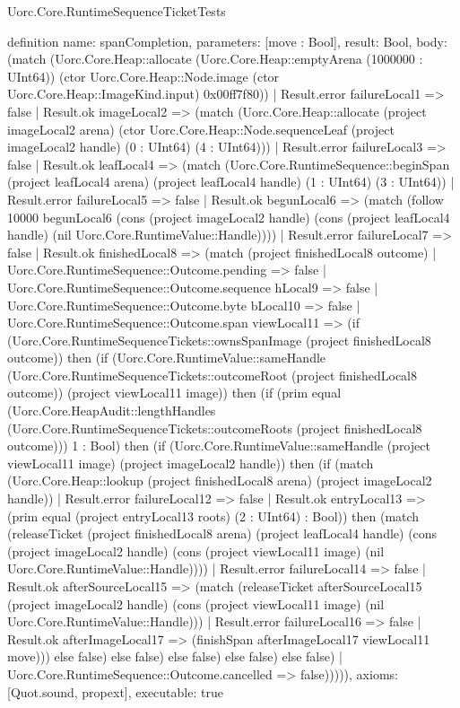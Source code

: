 \begin{lexlean}{Uorc.Core.RuntimeSequenceTicketTests}
\begin{semanticmodule}
definition{
  name: spanCompletion,
  parameters: [move : Bool],
  result: Bool,
  body: (match (Uorc.Core.Heap::allocate (Uorc.Core.Heap::emptyArena (1000000 : UInt64)) (ctor Uorc.Core.Heap::Node.image (ctor Uorc.Core.Heap::ImageKind.input) 0x00ff7f80))
    | Result.error failureLocal1 => false
    | Result.ok imageLocal2 => (match (Uorc.Core.Heap::allocate (project imageLocal2 arena) (ctor Uorc.Core.Heap::Node.sequenceLeaf (project imageLocal2 handle) (0 : UInt64) (4 : UInt64)))
      | Result.error failureLocal3 => false
      | Result.ok leafLocal4 => (match (Uorc.Core.RuntimeSequence::beginSpan (project leafLocal4 arena) (project leafLocal4 handle) (1 : UInt64) (3 : UInt64))
        | Result.error failureLocal5 => false
        | Result.ok begunLocal6 => (match (follow 10000 begunLocal6 (cons (project imageLocal2 handle) (cons (project leafLocal4 handle) (nil Uorc.Core.RuntimeValue::Handle))))
          | Result.error failureLocal7 => false
          | Result.ok finishedLocal8 => (match (project finishedLocal8 outcome)
            | Uorc.Core.RuntimeSequence::Outcome.pending => false
            | Uorc.Core.RuntimeSequence::Outcome.sequence hLocal9 => false
            | Uorc.Core.RuntimeSequence::Outcome.byte bLocal10 => false
            | Uorc.Core.RuntimeSequence::Outcome.span viewLocal11 => (if (Uorc.Core.RuntimeSequenceTickets::ownsSpanImage (project finishedLocal8 outcome)) then (if (Uorc.Core.RuntimeValue::sameHandle (Uorc.Core.RuntimeSequenceTickets::outcomeRoot (project finishedLocal8 outcome)) (project viewLocal11 image)) then (if (prim equal (Uorc.Core.HeapAudit::lengthHandles (Uorc.Core.RuntimeSequenceTickets::outcomeRoots (project finishedLocal8 outcome))) 1 : Bool) then (if (Uorc.Core.RuntimeValue::sameHandle (project viewLocal11 image) (project imageLocal2 handle)) then (if (match (Uorc.Core.Heap::lookup (project finishedLocal8 arena) (project imageLocal2 handle))
              | Result.error failureLocal12 => false
              | Result.ok entryLocal13 => (prim equal (project entryLocal13 roots) (2 : UInt64) : Bool)) then (match (releaseTicket (project finishedLocal8 arena) (project leafLocal4 handle) (cons (project imageLocal2 handle) (cons (project viewLocal11 image) (nil Uorc.Core.RuntimeValue::Handle))))
              | Result.error failureLocal14 => false
              | Result.ok afterSourceLocal15 => (match (releaseTicket afterSourceLocal15 (project imageLocal2 handle) (cons (project viewLocal11 image) (nil Uorc.Core.RuntimeValue::Handle)))
                | Result.error failureLocal16 => false
                | Result.ok afterImageLocal17 => (finishSpan afterImageLocal17 viewLocal11 move))) else false) else false) else false) else false) else false)
            | Uorc.Core.RuntimeSequence::Outcome.cancelled => false))))),
  axioms: [Quot.sound, propext],
  executable: true
}


\end{semanticmodule}
\end{lexlean}
